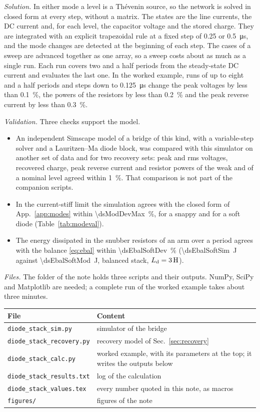 \documentclass[10pt,a4paper]{scrartcl}
\newcommand{\Ld}{L_\mathrm{d}}
\begin{document}
\emph{Solution.} In either mode a level is a Th\'evenin source, so the network is solved in closed form at every step, without a matrix. The states are the line currents, the DC current and, for each level, the capacitor voltage and the stored charge. They are integrated with an explicit trapezoidal rule at a fixed step of 0.25 or \SI{0.5}{\micro\second}, and the mode changes are detected at the beginning of each step. The cases of a sweep are advanced together as one array, so a sweep costs about as much as a single run. Each run covers two and a half periods from the steady-state DC current and evaluates the last one. In the worked example, runs of up to eight and a half periods and steps down to \SI{0.125}{\micro\second} change the peak voltages by less than \SI{0.1}{\percent}, the powers of the resistors by less than \SI{0.2}{\percent} and the peak reverse current by less than \SI{0.3}{\percent}.

\emph{Validation.} Three checks support the model.
\begin{itemize}
\item An independent Simscape model of a bridge of this kind, with a variable-step solver and a Lauritzen--Ma diode block, was compared with this simulator on another set of data and for two recovery sets: peak and rms voltages, recovered charge, peak reverse current and resistor powers of the weak and of a nominal level agreed within \SI{1}{\percent}. That comparison is not part of the companion scripts.
\item In the current-stiff limit the simulation agrees with the closed form of App.~\ref{app:modes} within \SI{\dsModDevMax}{\percent}, for a snappy and for a soft diode (Table~\ref{tab:modeval}).
\item The energy dissipated in the snubber resistors of an arm over a period agrees with the balance \eqref{eq:ebal} within \SI{\dsEbalSoftDev}{\percent} (\SI{\dsEbalSoftSim}{\joule} against \SI{\dsEbalSoftMod}{\joule}, balanced stack, $\Ld = \SI{\dsLdStiffSim}{\henry}$).
\end{itemize}

\emph{Files.} The folder of the note holds three scripts and their outputs. NumPy, SciPy and Matplotlib are needed; a complete run of the worked example takes about three minutes.
\begin{center}\small
\begin{tabular}{@{}ll@{}}
\toprule
File & Content \\
\midrule
\texttt{diode\_stack\_sim.py} & simulator of the bridge \\
\texttt{diode\_stack\_recovery.py} & recovery model of Sec.~\ref{sec:recovery} \\
\texttt{diode\_stack\_calc.py} & worked example, with its parameters at the top; it writes the outputs below \\
\texttt{diode\_stack\_results.txt} & log of the calculation \\
\texttt{diode\_stack\_values.tex} & every number quoted in this note, as macros \\
\texttt{figures/} & figures of the note \\
\bottomrule
\end{tabular}
\end{center}
\end{document}
